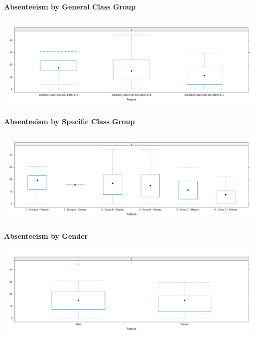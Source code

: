\documentclass[
]{article}
\begin{document}
\paragraph{Absenteeism by General Class
Group}\label{absenteeism-by-general-class-group}

\includegraphics{10.b.BBT4206-End-SemesterCourseEvaluation-20230821-20231128-BI2-BBIT4-2_files/figure-latex/AbsenteeismBoxandWhiskerGroup-1.pdf}

\paragraph{Absenteeism by Specific Class
Group}\label{absenteeism-by-specific-class-group}

\includegraphics{10.b.BBT4206-End-SemesterCourseEvaluation-20230821-20231128-BI2-BBIT4-2_files/figure-latex/AbsenteeismBoxandWhiskerSpecificGroup-1.pdf}

\paragraph{Absenteeism by Gender}\label{absenteeism-by-gender}

\includegraphics{10.b.BBT4206-End-SemesterCourseEvaluation-20230821-20231128-BI2-BBIT4-2_files/figure-latex/AbsenteeismBoxandWhiskerGender-1.pdf}
\end{document}
